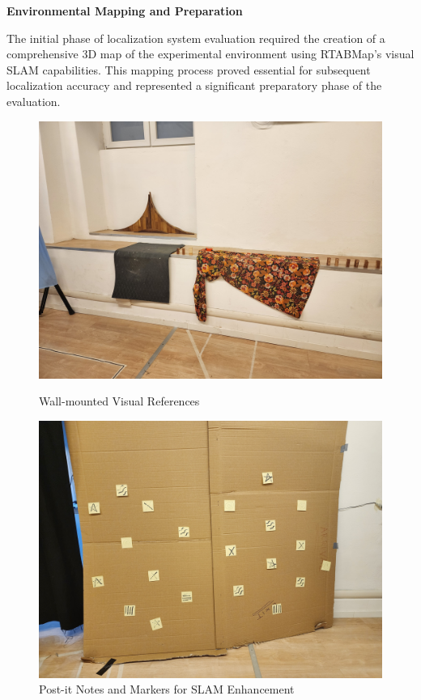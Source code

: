 \textbf{Environmental Mapping and Preparation}

The initial phase of localization system evaluation required the creation of a comprehensive 3D map of the experimental environment using RTABMap's visual SLAM capabilities. This mapping process proved essential for subsequent localization accuracy and represented a significant preparatory phase of the evaluation.

\begin{figure}[H]
    \centering
    \begin{minipage}{0.48\textwidth}
        \centering
        \includegraphics[width=\textwidth]{Images/LabVisualAids (6).jpg}
        \caption{Wall-mounted Visual References}
        \label{fig:lab_wall_features}
    \end{minipage}
    \hfill
    \begin{minipage}{0.48\textwidth}
        \centering
        \includegraphics[width=\textwidth]{Images/LabVisualAids (2).jpg}
        \caption{Post-it Notes and Markers for SLAM Enhancement}
        \label{fig:lab_postit_features}
    \end{minipage}
\end{figure}

